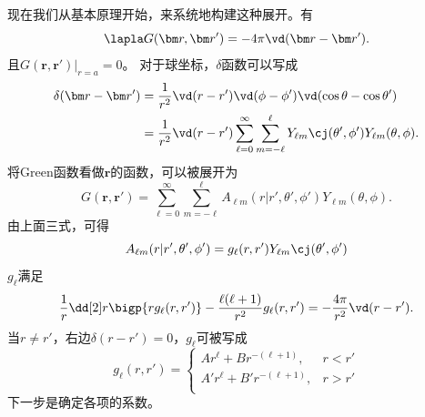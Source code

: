 现在我们从基本原理开始，来系统地构建这种展开。有%
\[
    \lapla G(\bm r,\bm r')=-4\pi\vd(\bm r-\bm r').
\]
且$G(\bm r,\bm r')|_{r=a}=0$。
对于球坐标，$\delta$函数可以写成
\begin{align*}
    \delta(\bm r-\bm r')&=\frac1{r^2}\vd(r-r')\vd(\phi-\phi')\vd(\cos\theta-\cos\theta')\\
    &=\frac1{r^2}\vd(r-r')\sum_{\ell=0}^\infty\sum_{m=-\ell}^\ell Y_{\ell m}\cj(\theta',\phi')Y_{\ell m}(\theta,\phi).
\end{align*}
将Green函数看做$\bm r$的函数，可以被展开为
\[
    G(\bm r,\bm r')=\sum_{\ell=0}^\infty\sum_{m=-\ell}^\ell A_{\ell m}(r|r',\theta',\phi')Y_{\ell m}(\theta,\phi).
\]
由上面三式，可得 
\[
    A_{\ell m}(r|r',\theta',\phi')=g_\ell(r,r')Y_{\ell m}\cj(\theta',\phi')
\]
$g_\ell$满足
\[
    \frac1r\dd[2]r\bigp{rg_\ell(r,r')}-\frac{\ell(\ell+1)}{r^2}g_\ell(r,r')=-\frac{4\pi}{r^2}\vd(r-r').
\]
当$r\neq r'$，右边$\delta(r-r')=0$，$g_\ell$可被写成
\[
    g_\ell(r,r')=
    \begin{cases}
        Ar^\ell+Br^{-(\ell+1)},&r<r'\\
        A'r^\ell+B'r^{-(\ell+1)},&r>r'\\
    \end{cases}
\]
下一步是确定各项的系数。
